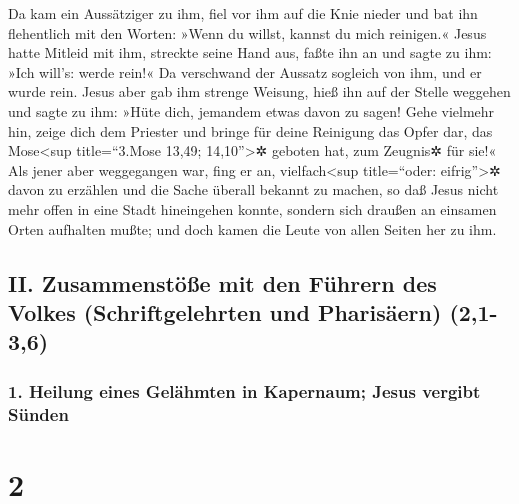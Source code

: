  Da kam ein Aussätziger zu ihm, fiel vor ihm auf die Knie
nieder und bat ihn flehentlich mit den Worten: »Wenn du willst, kannst
du mich reinigen.«  Jesus hatte Mitleid mit ihm, streckte
seine Hand aus, faßte ihn an und sagte zu ihm: »Ich will's: werde rein!«
 Da verschwand der Aussatz sogleich von ihm, und er wurde
rein.  Jesus aber gab ihm strenge Weisung, hieß ihn auf
der Stelle weggehen  und sagte zu ihm: »Hüte dich,
jemandem etwas davon zu sagen! Gehe vielmehr hin, zeige dich dem
Priester und bringe für deine Reinigung das Opfer dar, das
Mose\textless sup title=``3.Mose 13,49; 14,10''\textgreater✲ geboten
hat, zum Zeugnis✲ für sie!«  Als jener aber weggegangen
war, fing er an, vielfach\textless sup title=``oder:
eifrig''\textgreater✲ davon zu erzählen und die Sache überall bekannt zu
machen, so daß Jesus nicht mehr offen in eine Stadt hineingehen konnte,
sondern sich draußen an einsamen Orten aufhalten mußte; und doch kamen
die Leute von allen Seiten her zu ihm.

\hypertarget{ii.-zusammenstuxf6uxdfe-mit-den-fuxfchrern-des-volkes-schriftgelehrten-und-pharisuxe4ern-21-36}{%
\subsection{II. Zusammenstöße mit den Führern des Volkes
(Schriftgelehrten und Pharisäern)
(2,1-3,6)}\label{ii.-zusammenstuxf6uxdfe-mit-den-fuxfchrern-des-volkes-schriftgelehrten-und-pharisuxe4ern-21-36}}

\hypertarget{heilung-eines-geluxe4hmten-in-kapernaum-jesus-vergibt-suxfcnden}{%
\subsubsection{1. Heilung eines Gelähmten in Kapernaum; Jesus vergibt
Sünden}\label{heilung-eines-geluxe4hmten-in-kapernaum-jesus-vergibt-suxfcnden}}

\hypertarget{section-1}{%
\section{2}\label{section-1}}

